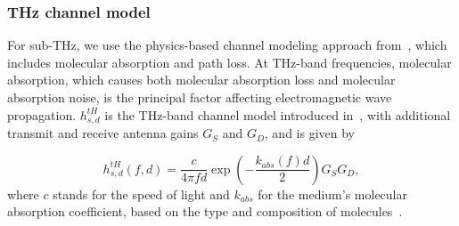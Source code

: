 \subsubsection*{THz channel model}
\label{sub:thzchannel}
%
%
For sub-THz, we use the physics-based channel modeling approach from~\cite{5995306}, which includes molecular absorption and path loss.
At THz-band frequencies, molecular absorption, which causes both molecular absorption loss and molecular absorption noise, is the principal factor affecting electromagnetic wave propagation. $h_{s, d}^{tH}$ is the THz-band channel model introduced in~\cite{5995306}, with additional transmit and receive antenna gains $G_S$ and $G_D$, and is given by
%

\begin{equation}
h_{s, d}^{tH}(f,d)=  \frac{c}{4 \pi f d} \exp \left( -\frac{k_{abs}(f)d}{2} \right)  G_{S}  G_{D} ,
\label{EQ_PHY}
\end{equation}
%
where $c$ stands for the speed of light and $k_{abs}$ for the medium's molecular absorption coefficient, based on the type and composition of molecules~\cite{hossain2018terasim}.

